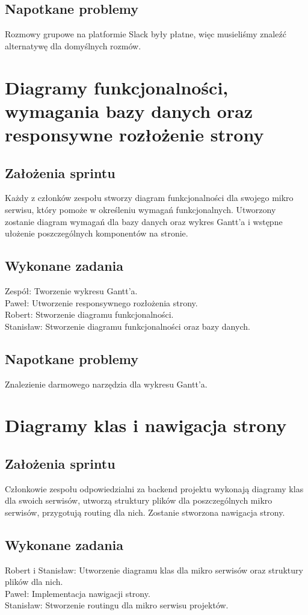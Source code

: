 \documentclass[a4paper,11pt]{report}
\begin{document}
\subsection {Napotkane problemy}
Rozmowy grupowe na platformie Slack były płatne, więc musieliśmy znaleźć alternatywę dla domyślnych rozmów.

\section {Diagramy funkcjonalności, wymagania bazy danych oraz responsywne rozłożenie strony}
\subsection {Założenia sprintu}
Każdy z członków zespołu stworzy diagram funkcjonalności dla swojego mikro serwisu, który pomoże w określeniu wymagań funkcjonalnych. Utworzony zostanie diagram wymagań dla bazy danych oraz wykres Gantt’a i wstępne ułożenie poszczególnych komponentów na stronie.
\subsection {Wykonane zadania}
Zespół: Tworzenie wykresu Gantt'a.\\
Paweł: Utworzenie responsywnego rozłożenia strony. \\
Robert: Stworzenie diagramu funkcjonalności. \\
Stanisław: Stworzenie diagramu funkcjonalności oraz bazy danych.\\
\subsection {Napotkane problemy}
Znalezienie darmowego narzędzia dla wykresu Gantt'a.

\section {Diagramy klas i nawigacja strony}
\subsection {Założenia sprintu}
Członkowie zespołu odpowiedzialni za backend projektu wykonają diagramy klas dla swoich serwisów, utworzą struktury plików dla poszczególnych mikro serwisów, przygotują routing dla nich. Zostanie stworzona nawigacja strony.
\subsection {Wykonane zadania}
Robert i Stanisław: Utworzenie diagramu klas dla mikro serwisów oraz struktury plików dla nich.\\
Paweł: Implementacja nawigacji strony. \\
Stanisław: Stworzenie routingu dla mikro serwisu projektów.\\
\end{document}
